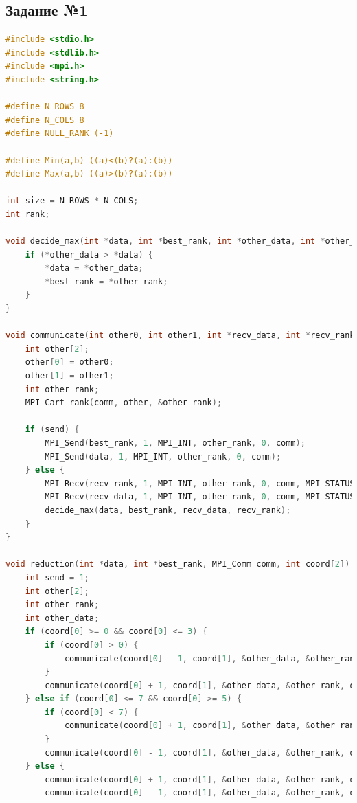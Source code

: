 \documentclass[a4paper]{article}
\begin{document}
\lstset{style=mystyle}

\subsection{Задание №1}

\begin{lstlisting}[caption=transputer\_matrix.c, label={lst:1}, language=C]
#include <stdio.h>
#include <stdlib.h>
#include <mpi.h>
#include <string.h>

#define N_ROWS 8
#define N_COLS 8
#define NULL_RANK (-1)

#define Min(a,b) ((a)<(b)?(a):(b))
#define Max(a,b) ((a)>(b)?(a):(b))

int size = N_ROWS * N_COLS;
int rank;

void decide_max(int *data, int *best_rank, int *other_data, int *other_rank) {
    if (*other_data > *data) {
        *data = *other_data;
        *best_rank = *other_rank;
    }
}

void communicate(int other0, int other1, int *recv_data, int *recv_rank, int *data, int *best_rank, int send, MPI_Comm comm) {
    int other[2];
    other[0] = other0;
    other[1] = other1;
    int other_rank;
    MPI_Cart_rank(comm, other, &other_rank);

    if (send) {
        MPI_Send(best_rank, 1, MPI_INT, other_rank, 0, comm);
        MPI_Send(data, 1, MPI_INT, other_rank, 0, comm);
    } else {
        MPI_Recv(recv_rank, 1, MPI_INT, other_rank, 0, comm, MPI_STATUS_IGNORE);
        MPI_Recv(recv_data, 1, MPI_INT, other_rank, 0, comm, MPI_STATUS_IGNORE);
        decide_max(data, best_rank, recv_data, recv_rank);
    }
}

void reduction(int *data, int *best_rank, MPI_Comm comm, int coord[2]) {
    int send = 1;
    int other[2];
    int other_rank;
    int other_data;
    if (coord[0] >= 0 && coord[0] <= 3) {
        if (coord[0] > 0) {
            communicate(coord[0] - 1, coord[1], &other_data, &other_rank, data, best_rank, !send, comm);
        }
        communicate(coord[0] + 1, coord[1], &other_data, &other_rank, data, best_rank, send, comm);
    } else if (coord[0] <= 7 && coord[0] >= 5) {
        if (coord[0] < 7) {
            communicate(coord[0] + 1, coord[1], &other_data, &other_rank, data, best_rank, !send, comm);
        }
        communicate(coord[0] - 1, coord[1], &other_data, &other_rank, data, best_rank, send, comm);
    } else {
        communicate(coord[0] + 1, coord[1], &other_data, &other_rank, data, best_rank, !send, comm);
        communicate(coord[0] - 1, coord[1], &other_data, &other_rank, data, best_rank, !send, comm);


\end{lstlisting}
\end{document}
